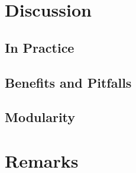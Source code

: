 \section{Discussion}

\subsection{In Practice}

\subsection{Benefits and Pitfalls}

\subsection{Modularity}

\section{Remarks}
